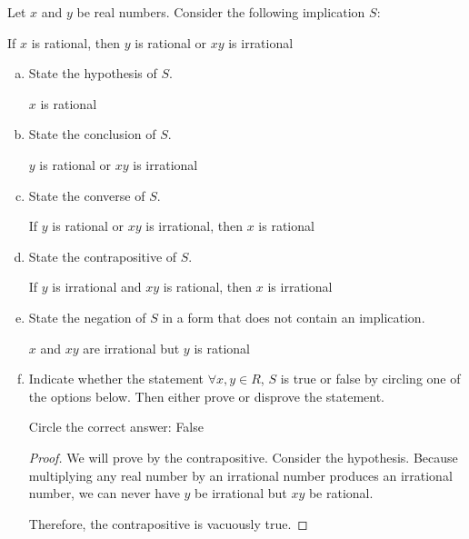 \question Let $x$ and $y$ be real numbers. Consider the following implication $S$:
\begin{center}
  If $x$ is rational, then $y$ is rational or $xy$ is irrational
\end{center}
\begin{enumerate}[(a)]
  \item State the hypothesis of $S$. \begin{center}
          $x$ is rational
        \end{center}
  \item State the conclusion of $S$. \begin{center}
          $y$ is rational or $xy$ is irrational
        \end{center}
  \item State the converse of $S$. \begin{center}
          If $y$ is rational or $xy$ is irrational, then $x$ is rational
        \end{center}
  \item State the contrapositive of $S$. \begin{center}
          If $y$ is irrational and $xy$ is rational, then $x$ is irrational
        \end{center}
  \item State the negation of $S$ in a form that does not contain an implication. \begin{center}
          $x$ and $xy$ are irrational but $y$ is rational
        \end{center}
  \item Indicate whether the statement $\forall x, y \in R$,
        $S$ is true or false by circling one of the options below.
        Then either prove or disprove the statement.

        Circle the correct answer: \quad {} \quad False
        \begin{proof}
          We will prove by the contrapositive.
          Consider the hypothesis.
          Because multiplying any real number by an irrational number produces an irrational number,
          we can never have $y$ be irrational but $xy$ be rational.

          Therefore, the contrapositive is vacuously true.
        \end{proof}
\end{enumerate}


